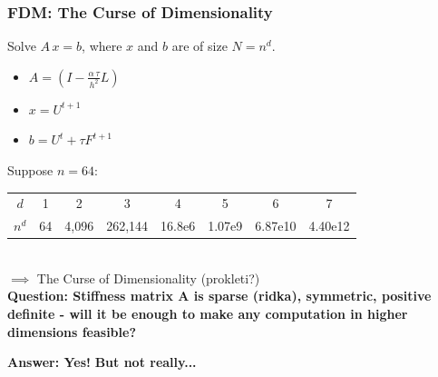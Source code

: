 \documentclass{beamer}
\begin{document}
\begin{frame}
\frametitle{FDM: The Curse of Dimensionality}

Solve $A\,x=b$, where $x$ and $b$ are of size $N=n^d$.
\begin{itemize}
\item $A = (I - \frac{\alpha\,\tau}{h^2} L)$
\item $x = U^{t+1}$
\item $b = U^t + \tau F^{t+1}$
\end{itemize}

\pause
Suppose $n=64$:
\begin{tabular}{ c c c c c c c c }
 $d$ & 1 & 2 & 3 & 4 & 5 & 6 & 7\\ 
 $n^d$ & 64 & 4,096 & 262,144 & 16.8e6 & 1.07e9 & 6.87e10 & 4.40e12
\end{tabular}
\\

\pause
 $\implies$  The Curse of Dimensionality (prokleti?) \\

\pause
\textbf{Question: Stiffness matrix A is sparse (ridka), symmetric, positive definite - will it be enough to make any computation in higher dimensions feasible?}

\pause
\textbf{Answer: Yes!}\pause\textbf{ But not really...}

\end{frame}
\end{document}
